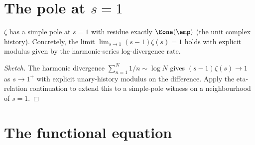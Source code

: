 \section{The pole at \(s = 1\)}

\begin{theorem}[Simple pole at \(s = 1\) with residue 1]
\label{thm:pole-at-one-residue}
\(\zeta\) has a simple pole at \(s = 1\) with residue exactly \(\Eone(\emp)\) (the unit complex history). Concretely, the limit \(\lim_{s \to 1} (s - 1) \zeta(s) = 1\) holds with explicit modulus given by the harmonic-series log-divergence rate.
\end{theorem}
\begin{proof}[Sketch]
The harmonic divergence \(\sum_{n=1}^N 1/n \sim \log N\) gives \((s - 1) \zeta(s) \to 1\) as \(s \to 1^+\) with explicit unary-history modulus on the difference. Apply the eta-relation continuation to extend this to a simple-pole witness on a neighbourhood of \(s = 1\).
\end{proof}

\section{The functional equation}

